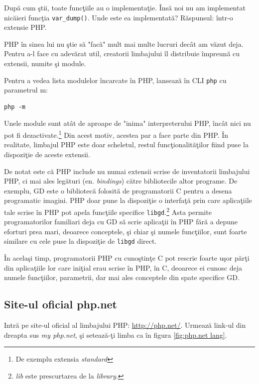 După cum ştii, toate funcţiile au o implementaţie. Însă
noi nu am implementat nicăieri funcţia \texttt{var\_dump()}. Unde
este ea implementată? Răspunsul: într-o extensie PHP.

PHP în sinea lui nu ştie să "facă" mult mai multe lucruri decât
am văzut deja. Pentru a-l face cu adevărat util, creatorii
limbajului îl distribuie împreună cu extensii, numite şi module.

Pentru a vedea lista modulelor încarcate în PHP, lansează
în CLI \texttt{php} cu parametrul \-m:
\begin{verbatim}
php -m
\end{verbatim}
Unele module sunt atât de aproape de "inima" interpreterului
PHP, încât nici nu pot fi dezactivate.\footnote{De exemplu
extensia \textit{standard}} Din acest motiv, acestea
par a face parte din PHP. În realitate, limbajul PHP
este doar scheletul, restul funcţionalităţilor
fiind puse la dispoziţie de aceste extensii.

De notat este că PHP include nu numai extensii scrise
de inventatorii limbajului PHP, ci mai ales legături
(en. \textsl{bindings})
către bibliotecile altor programe. De exemplu,
GD este o bibliotecă folosită de programatorii C
pentru a desena programatic imagini. PHP doar
pune la dispoziţie o interfaţă prin care aplicaţiile
tale scrise în PHP pot apela funcţiile specifice \texttt{libgd}.\footnote{\textit{lib}
este prescurtarea de la \textit{library}.}
Asta permite programatorilor familiari deja cu GD
să scrie aplicaţii în PHP fără a depune eforturi
prea mari, deoarece conceptele, şi chiar şi numele funcţiilor,
sunt foarte similare cu cele puse la dispoziţie de \texttt{libgd}
direct.

În acelaşi timp, programatorii PHP cu cunoştinţe C
pot rescrie foarte uşor părţi din aplicaţiile lor
care iniţial erau scrise în PHP, în C, deoarece
ei cunosc deja numele funcţiilor, parametrii,
dar mai ales conceptele din spate specifice 
GD.


\subsection{Site-ul oficial php.net}
Intră pe site-ul oficial al limbajului PHP: \url{http://php.net/}.
Urmează link-ul din dreapta sus \textit{my php.net}, şi setează-ţi
limba ca în figura \ref{fig:php.net lang}.

